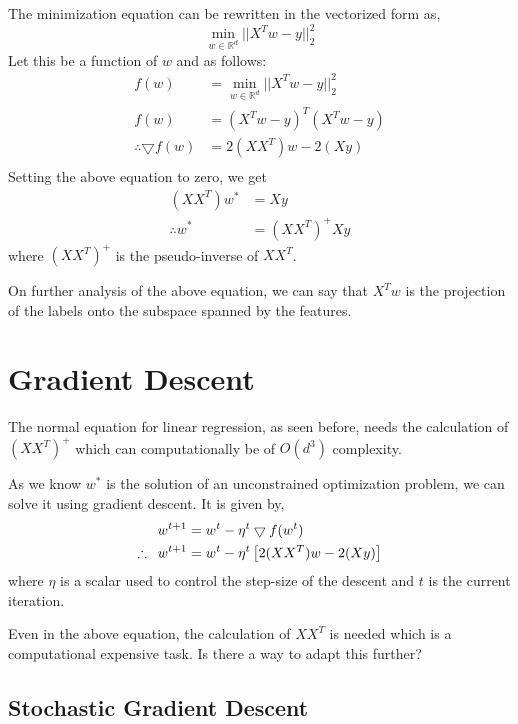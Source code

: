 \documentclass[
]{article}
\begin{document}
The minimization equation can be rewritten in the vectorized form as, \[
\min _{w \in \mathbb{R}^d} || X^Tw - y || ^2 _2
\] Let this be a function of \(w\) and as follows: \begin{align*}
f(w) &= \min _{w \in \mathbb{R}^d} || X^Tw - y || ^2 _2 \\
f(w) &= (X^Tw - y)^T(X^Tw - y) \\
\therefore\bigtriangledown f(w) &= 2(XX^T)w - 2(Xy) \\
\end{align*} Setting the above equation to zero, we get \begin{align*}
(XX^T)w^* &= Xy \\
\therefore w^* &= (XX^T)^+Xy
\end{align*} where \((XX^T)^+\) is the pseudo-inverse of \(XX^T\).

On further analysis of the above equation, we can say that \(X^Tw\) is
the projection of the labels onto the subspace spanned by the features.

\hypertarget{gradient-descent}{%
\section{Gradient Descent}\label{gradient-descent}}

The normal equation for linear regression, as seen before, needs the
calculation of \((XX^T)^+\) which can computationally be of \(O(d^3)\)
complexity.

As we know \(w^*\) is the solution of an unconstrained optimization
problem, we can solve it using gradient descent. It is given by,
\begin{align*}
w^{t+1} &= w^t - \eta^t \bigtriangledown f(w^t) \\
\therefore \hspace{0.5em} w^{t+1} &= w^t - \eta^t \left [ 2(XX^T)w - 2(Xy) \right ]
\end{align*} where \(\eta\) is a scalar used to control the step-size of
the descent and \(t\) is the current iteration.

Even in the above equation, the calculation of \(XX^T\) is needed which
is a computational expensive task. Is there a way to adapt this further?

\hypertarget{stochastic-gradient-descent}{%
\subsection{Stochastic Gradient
Descent}\label{stochastic-gradient-descent}}
\end{document}
